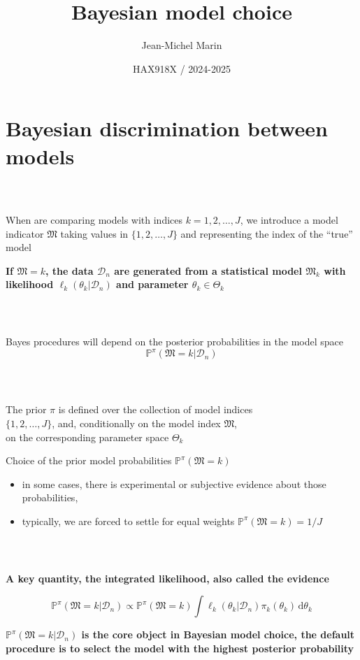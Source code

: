 \documentclass[notes,professionalfont,11pt,usenames,dvipsnames]{beamer}
\title[Bayesian model choice]{Bayesian model choice}
\author[Jean-Michel Marin]{Jean-Michel Marin}
\institute[IMAG]{University of Montpellier \\
Faculty of Sciences}
\date[HAX918X]{HAX918X / 2024-2025}
\renewcommand{\mathcal}{\mathscr}
\renewcommand{\mathcal}{\mathscr}
\renewcommand{\P}{\mathbb{P}}
\newcommand\justify{\rightskip0pt \leftskip0pt}
\newenvironment{slide}
{\begin{frame}[environment=slide]
\frametitle{\insertsection \\ \insertsubsection}\justify\setlength{\parskip}{0.5cm}\vspace{-1.5cm}}
{\end{frame}}
\begin{document}
\frame{\titlepage}

\frame{\tableofcontents} 

\section{Bayesian discrimination between models}

\begin{slide}

When are comparing models with indices $k=1,2,\ldots,J$,
we introduce a model indicator $\mathfrak{M}$ taking values
in $\{1,2,\ldots,J\}$ and representing the index of the ``true'' model 


{\bf \color{red} If $\mathfrak{M}=k$, the data $\mathcal{D}_n$ are generated from a statistical model $\mathfrak{M}_k$
with likelihood  $\ell_k(\theta_k|\mathcal{D}_n)$ and parameter $\theta_k\in\Theta_k$}

\end{slide}

\begin{slide}

Bayes procedures will depend on the posterior probabilities in the model space 
$$
\P^\pi(\mathfrak{M}=k|\mathcal{D}_n)
$$

\end{slide}

\begin{slide}

The prior $\pi$ is defined over the collection of model indices \\
$\{1,2,\ldots,J\}$, 
and, conditionally on the model index $\mathfrak{M}$, \\ 
on the corresponding parameter space $\Theta_k$


Choice of the prior model probabilities $\P^\pi(\mathfrak{M}=k)$
\begin{itemize}
\item in some cases, there is experimental or subjective evidence about those probabilities, 
\item typically, we are forced to settle for equal weights $\P^\pi(\mathfrak{M}=k)=1/J$
\end{itemize}

\end{slide}

\begin{slide}

\textbf{A key quantity, the integrated likelihood, also called the evidence}

$$
\P^\pi(\mathfrak{M}=k|\mathcal{D}_n) \propto 
\P^\pi(\mathfrak{M}=k) \int \ell_k(\theta_k|\mathcal{D}_n)\pi_k(\theta_k)\,\text{d}\theta_k
$$


{\bf\color{red} $\P^\pi(\mathfrak{M}=k|\mathcal{D}_n)$ is the core object in Bayesian model choice,
the default procedure is to select the model with the highest posterior probability}

\end{slide}
\end{document}
